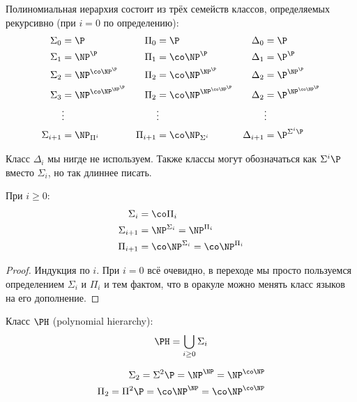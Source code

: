 	\begin{Def}
		Полиномиальная иерархия состоит из трёх семейств классов, определяемых рекурсивно (при $i=0$ по определению):
		\begin{align*}
			\Sigma_0 &= \P & \Pi_0 &= \P & \Delta_0 &= \P \\
			\Sigma_1 &= \NP^{\P} & \Pi_1 &= \co\NP^{\P} & \Delta_1 &= \P^{\P} \\
			\Sigma_2 &= \NP^{\co\NP^{\P}} & \Pi_2 &= \co\NP^{\NP^{\P}} & \Delta_2 &= \P^{\NP^\P} \\
			\Sigma_3 &= \NP^{\co\NP^{\NP^{\P}}} & \Pi_2 &= \co\NP^{\NP^{\co\NP^{\P}}} & \Delta_2 &= \P^{\NP^{\co\NP^\P}} \\
			&\vdots && \vdots && \vdots \\
			\Sigma_{i+1} &= \NP_{\Pi^i} & \Pi_{i+1} &= \co\NP_{\Sigma^i} & \Delta_{i+1} &= \P^{\Sigma^i\P}
		\end{align*}
	\end{Def}
	\begin{Rem}
		Класс $\Delta_i$ мы нигде не используем.
		Также классы могут обозначаться как $\Sigma^i \P$ вместо $\Sigma_i$, но так длиннее писать.
	\end{Rem}
	\begin{assertion}
		При $i \ge 0$:
		\begin{align*}
			\Sigma_i &= \co\Pi_i \\
			\Sigma_{i+1} &= \NP^{\Sigma_i} = \NP^{\Pi_i} \\
			\Pi_{i+1} &= \co\NP^{\Sigma_i} = \co\NP^{\Pi_i} \\
		\end{align*}
	\end{assertion}
	\begin{proof}
		Индукция по $i$.
		При $i=0$ всё очевидно, в переходе мы просто пользуемся определением $\Sigma_i$ и $\Pi_i$ и тем фактом, что в оракуле можно менять класс языков на его дополнение.
	\end{proof}
	\begin{Def}
		Класс $\PH$ (polynomial hierarchy):
		\[ \PH = \bigcup_{i \ge 0} \Sigma_i \]
	\end{Def}
	\begin{exmp}
		\begin{align*}
			\Sigma_2 = \Sigma^2 \P = \NP^{\NP} = \NP^{\co\NP} \\
			\Pi_2 = \Pi^2 \P = \co\NP^{\NP} = \co\NP^{\co\NP}
		\end{align*}
	\end{exmp}

